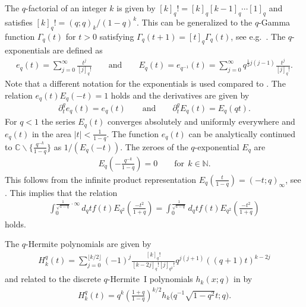 \documentclass[pdftex]{sigma}
\newcommand{\mC}{\mathbb{C}}
\newcommand{\mN}{\mathbb{N}}
\numberwithin{equation}{section}
\begin{document}
The $q$-factorial of an integer $k$ is given by $[k]_q!=[k]_q[k-1]_q\cdots [1]_q$ and satisf\/ies $[k]_q!=(q;q)_k/(1-q)^k$. This can be generalized to the $q$-Gamma function $\Gamma_q(t)$ for $t>0$ satisfying $\Gamma_q(t+1)=[t]_q\Gamma_q(t)$, see e.g.~\cite[formula (1.10.1)]{MR1052153}. The $q$-exponentials are def\/ined as
\begin{gather*}
e_q(t)=\sum_{j=0}^\infty\frac{t^j}{[j]_q!} \qquad \mbox{and} \qquad E_q(t)=e_{q^{-1}}(t)=\sum_{j=0}^\infty q^{\frac{1}{2}j(j-1)}\frac{t^j}{[j]_q!}.
\end{gather*}
Note that a dif\/ferent notation for the exponentials is used compared to \cite{MR2595267}. The relation $e_q(t)E_q(-t)=1$ holds and the derivatives are given by
\begin{gather}
\label{aflexp}
\partial_t^qe_q(t)=e_q(t) \qquad \mbox{and}\qquad \partial_t^qE_q(t)=E_q(qt).
\end{gather}
For $q<1$ the series $E_q(t)$ converges absolutely and uniformly everywhere and $e_q(t)$ in the area $|t|<\frac{1}{1-q}$. The function $e_q(t)$ can be analytically continued to $\mC\backslash \{\frac{q^{-k}}{1-q}\}$ as $1/(E_q(-t))$. The zeroes of the $q$-exponential $E_q$ are
\begin{gather}
\label{zeroes}
E_{q}\left(-\frac{q^{-k}}{1-q}\right) = 0\qquad \mbox{for} \ \ k\in\mN.
\end{gather}
This follows from the inf\/inite product representation $E_q(\frac{t}{1-q})=(-t;q)_\infty$, see \cite[formula (1.3.16)]{MR1052153}. This implies that the relation
\begin{gather}
\label{intinfeind}
\int_0^{\frac{1}{\sqrt{1-q}}\cdot\infty}d_qt f(t) E_{q^2}\left(\frac{-t^2}{1+q}\right)=\int_0^{\frac{1}{\sqrt{1-q}}}d_qt f(t) E_{q^2}\left(\frac{-t^2}{1+q}\right)
\end{gather}
holds.



The $q$-Hermite polynomials are given by
\begin{gather}
\label{Hermite}
H_k^q(t) = \sum_{j=0}^{\lfloor k/2\rfloor}(-1)^j\frac{[k]_q!}{[k-2j]_q![j]_{q^2}!}q^{j(j+1)}((q+1)t)^{k-2j}
\end{gather}
and related to the discrete $q$-Hermite~I polynomials $h_k(x;q)$ in \cite[Section~3.28]{Koekoek}  by
\begin{gather*}
H_k^q(t) = q^k\left(\frac{1+q}{1-q}\right)^{k/2}h_k\Big(q^{-1}\sqrt{1-q^2}t;q\Big).
\end{gather*}
\end{document}
